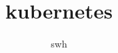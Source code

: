 \documentclass[12pt,twiside,a4paper]{ctexbook}
\numberwithin{chapter}{part}
\begin{document}

\author
{
swh
}


\title{kubernetes}
\maketitle
\tableofcontents %
\newpage
\pagestyle{fancy}
\end{document}
